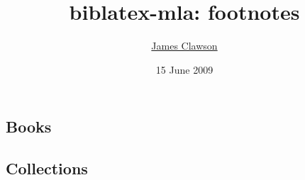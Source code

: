 \documentclass[12pt]{article}
\title{biblatex-mla: footnotes}
\author{\href{mailto:clawson@gmail.com}{James Clawson}}
\date{15 June 2009}
\begin{document}
\maketitle


\subsection{Books}


\autocite{durant65aa}

\autocite{borroff67aa}

\autocite{durant77aa}

\autocite{gilbert79aa}

\autocite{borroff79aa}

\autocite{freedman84aa}

\autocite{quirk85ab}

\autocite{quirk85aa}

\autocite{sevillano86aa}

\autocite{american-medical-association89aa}

\autocite{frye91aa}

\autocite{public-agenda-foundation92aa}

\autocite{spafford92aa}

\autocite{tatar92aa}

\autocite{gilman93ab}

\autocite{gilman93aa}

\autocite{marquart94aa}

\autocite{berlage94aa}

\autocite{silver97aa}

\autocite{eggins97aa}

\autocite{national-research-council00aa}

\autocite{rowling00aa}

\autocite{hutcheon00aa}

\autocite{lecarre01aa}

\autocite{kurlansky02aa}

\autocite{fukuyama02aa}

\autocite{wpa00aa}

\autocite{ishiguro01aa}


\subsection{Collections}
\end{document}
